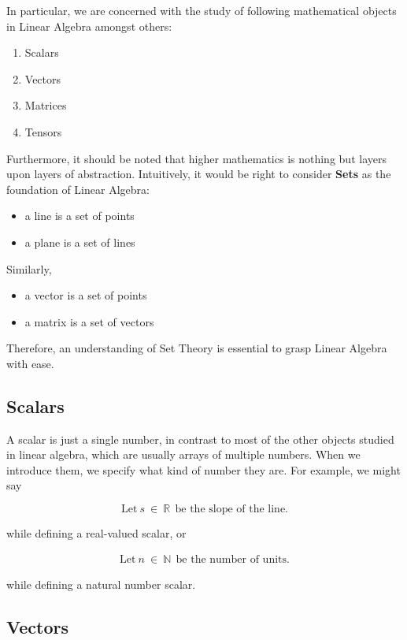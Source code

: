 \documentclass[12pt]{article}
\begin{document}
In particular, we are concerned with the study of following mathematical objects in Linear Algebra amongst others:

\begin{enumerate}
    \item Scalars
    \item Vectors
    \item Matrices
    \item Tensors
\end{enumerate}

Furthermore, it should be noted that higher mathematics is nothing but layers upon layers of abstraction. Intuitively, it would be right to consider \textbf{Sets} as the foundation of Linear Algebra:
\begin{itemize}
    \item a line is a set of points
    \item a plane is a set of lines
\end{itemize}

Similarly,
\begin{itemize}
    \item a vector is a set of points
    \item a matrix is a set of vectors
\end{itemize}

Therefore, an understanding of Set Theory is essential to grasp Linear Algebra with ease.

\subsection{Scalars}

A scalar is just a single number, in contrast to most of the other objects studied in linear algebra, which are usually arrays of multiple numbers. When we introduce them, we specify what kind of number they are. For example, we might say

\begin{equation*}
\text{Let}\ s\ \in\ \mathbb{R}\ \ \text{be the slope of the line}.
\end{equation*}

while defining a real-valued scalar, or

\begin{align}
\text{Let}\ n\ \in\ \mathbb{N}\ \ \text{be the number of units}.
\end{align}

while defining a natural number scalar.

\subsection{Vectors}
\end{document}

